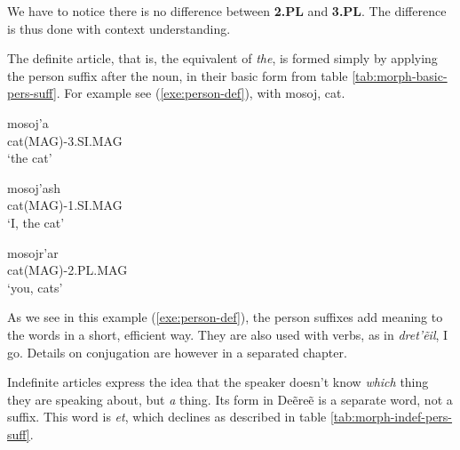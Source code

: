 We have to notice there is no difference between \textbf{2.PL} and \textbf{3.PL}. The difference is
thus done with context understanding.

The definite article, that is, the equivalent of \emph{the}, is formed simply by applying the person
suffix after the noun, in their basic form from table \ref{tab:morph-basic-pers-suff}. For example
see (\ref{exe:person-def}), with \gls{mosoj}, cat.

\begin{exe}
\ex\label{exe:person-def}
\begin{xlist}
\ex\gll mosoj’a\\
cat(MAG)-3.SI.MAG\\
\trans ‘the cat’

\ex\gll mosoj’ash\\
cat(MAG)-1.SI.MAG\\
\trans ‘I, the cat’

\ex\gll mosojr’ar\\
cat(MAG)-2.PL.MAG\\
\trans ‘you, cats’
\end{xlist}
\end{exe}

As we see in this example (\ref{exe:person-def}), the person suffixes add meaning to the words in a
short, efficient way. They are also used with verbs, as in \emph{dret’ẽil}, I go. Details on
conjugation are however in a separated chapter.

Indefinite articles express the idea that the speaker doesn’t know \emph{which} thing they are
speaking about, but \emph{a} thing. Its form in Deẽreẽ is a separate word, not a suffix. This word
is \emph{et}, which declines as described in table \ref{tab:morph-indef-pers-suff}.

